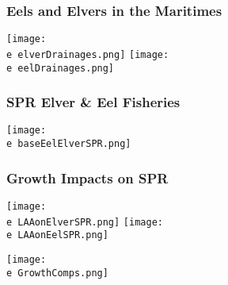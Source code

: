 \documentclass{beamer}
\newcommand{\e}{/backup/bio_data/bio.eels/figures/}
\begin{document}
\begin{frame}
	\frametitle{Eels and Elvers in the Maritimes}
	\centering
	  \texttt{[image: \\e elverDrainages.png]}
	  \texttt{[image: \\e eelDrainages.png]}\\



\end{frame}

\begin{frame}
	\frametitle{SPR Elver \& Eel Fisheries}
	\centering
	  \texttt{[image: \\e baseEelElverSPR.png]}

\end{frame}



\begin{frame}
	\frametitle{Growth Impacts on SPR}
	\centering
	  \texttt{[image: \\e LAAonElverSPR.png]}
		  \texttt{[image: \\e LAAonEelSPR.png]}
	
	  \texttt{[image: \\e GrowthComps.png]}
	
\end{frame}


	
\end{document}
